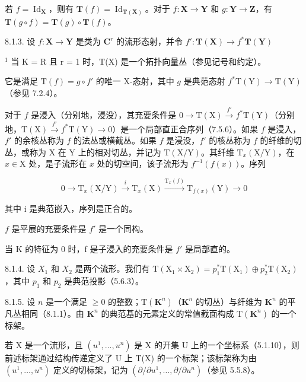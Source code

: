 若 \(f = \operatorname{Id}_{\mathbf{X}}\)，则有 \(\mathbf{T}(f) = \operatorname{Id}_{\mathbf{T}(\mathbf{X})}\)。对于 \(f: \mathbf{X} \to \mathbf{Y}\) 和 \(g: \mathbf{Y} \to \mathbf{Z}\)，有 \(\mathbf{T}(g \circ f) = \mathbf{T}(g) \circ \mathbf{T}(f)\)。

8.1.3. 设 \(f: \mathbf{X} \to \mathbf{Y}\) 是类为 \(\mathbf{C}^r\) 的流形态射，并令 \(f': \mathbf{T}(\mathbf{X}) \to f^* \mathbf{T}(\mathbf{Y})\)

\(^{1}\) 当 K = R 且 r = 1 时，T(X) 是一个拓扑向量丛（参见记号和约定）。

它是满足 \(\mathrm{T}(f) = g \circ f'\) 的唯一 X-态射，其中 \(g\) 是典范态射 \(f^{*}\mathrm{T}(\mathrm{Y}) \to \mathrm{T}(\mathrm{Y})\)（参见 7.2.4）。

对于 \(f\) 是浸入（分别地，浸没），其充要条件是 \(0 \to \mathrm{T}(\mathrm{X}) \xrightarrow{f'} f^* \mathrm{T}(\mathrm{Y})\)（分别地，\(\mathrm{T}(\mathrm{X}) \xrightarrow{f'} f^* \mathrm{T}(\mathrm{Y}) \to 0\)）是一个局部直正合序列（7.5.6）。如果 \(f\) 是浸入，\(f'\) 的余核丛称为 \(f\) 的法丛或横截丛。如果 \(f\) 是浸没，\(f'\) 的核丛称为 \(f\) 的纤维的切丛，或称为 X 在 Y 上的相对切丛，并记为 \(\mathrm{T}(\mathrm{X}/\mathrm{Y})\)。其纤维 \(\mathrm{T}_x(\mathrm{X}/\mathrm{Y})\)，在 \(x \in \mathrm{X}\) 处，是子流形在 \(x\) 处的切空间，该子流形为 \(f^{-1}(f(x))\)。序列

\[
0 \longrightarrow \mathrm{T} _ {x} (\mathrm{X} / \mathrm{Y}) \stackrel {i} {\longrightarrow} \mathrm{T} _ {x} (\mathrm{X}) \stackrel {\mathrm{T} _ {x} (f)} {\longrightarrow} \mathrm{T} _ {f (x)} (\mathrm{Y}) \longrightarrow 0
\]

其中 i 是典范嵌入，序列是正合的。

\(f\) 是平展的充要条件是 \(f'\) 是一个同构。

当 K 的特征为 0 时，f 是子浸入的充要条件是 \(f'\) 是局部直的。

8.1.4. 设 \(X_{1}\) 和 \(X_{2}\) 是两个流形。我们有 \(\mathrm{T}(\mathrm{X}_{1} \times \mathrm{X}_{2}) = p_{1}^{*}\mathrm{T}(\mathrm{X}_{1}) \oplus p_{2}^{*}\mathrm{T}(\mathrm{X}_{2})\)，其中 \(p_{1}\) 和 \(p_{2}\) 是典范投影（5.6.3）。

8.1.5. 设 \(n\) 是一个满足 \(\geqslant 0\) 的整数；\(\mathrm{T}(\mathbf{K}^{n})\)（\(\mathbf{K}^{n}\) 的切丛）与纤维为 \(\mathbf{K}^{n}\) 的平凡丛相同（8.1.1）。由 \(\mathbf{K}^{n}\) 的典范基的元素定义的常值截面构成 \(\mathrm{T}(\mathbf{K}^{n})\) 的一个标架。

若 X 是一个流形，且 \((u^{1},\ldots,u^{n})\) 是 X 的开集 U 上的一个坐标系（5.1.10），则前述标架通过结构传递定义了 U 上 T(X) 的一个标架；该标架称为由 \((u^{1},\ldots,u^{n})\) 定义的切标架，记为 \((\partial/\partial u^{1},\ldots,\partial/\partial u^{n})\)（参见 5.5.8）。

